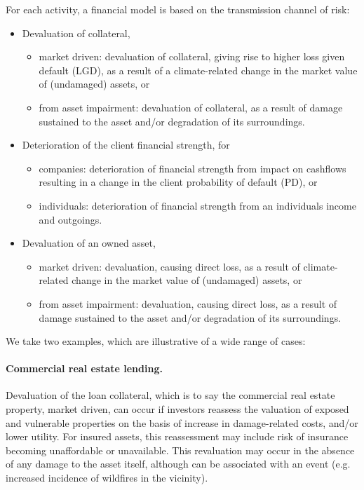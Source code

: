 \documentclass[a4paper,11pt]{extarticle} %
\theoremstyle{definition}
\begin{document}
For each activity, a financial model is based on the transmission channel of risk:

\begin{itemize}
\item Devaluation of collateral,
    \begin{itemize}
        \item market driven: devaluation of collateral, giving rise to higher loss given default (LGD), as a result of a climate-related change in the market value of (undamaged) assets, or
        \item from asset impairment: devaluation of collateral, as a result of damage sustained to the asset and/or degradation of its surroundings.
    \end{itemize}
\item Deterioration of the client financial strength, for
    \begin{itemize}
        \item companies: deterioration of financial strength from impact on cashflows resulting in a change in the client probability of default (PD), or
        \item individuals: deterioration of financial strength from an individuals income and outgoings.
    \end{itemize}
\item Devaluation of an owned asset,
    \begin{itemize}
        \item market driven: devaluation, causing direct loss, as a result of climate-related change in the market value of (undamaged) assets, or
        \item from asset impairment: devaluation, causing direct loss, as a result of damage sustained to the asset and/or degradation of its surroundings.
    \end{itemize}
\end{itemize}

We take two examples, which are illustrative of a wide range of cases:
\paragraph{Commercial real estate lending.} Devaluation of the loan collateral, which is to say the commercial real estate property, market driven, can occur if investors reassess the valuation of exposed and vulnerable properties on the basis of increase in damage-related costs, and/or lower utility. For insured assets, this reassessment may include risk of insurance becoming unaffordable or unavailable. This revaluation may occur in the absence of any damage to the asset itself, although can be associated with an event (e.g. increased incidence of wildfires in the vicinity).
\end{document}
